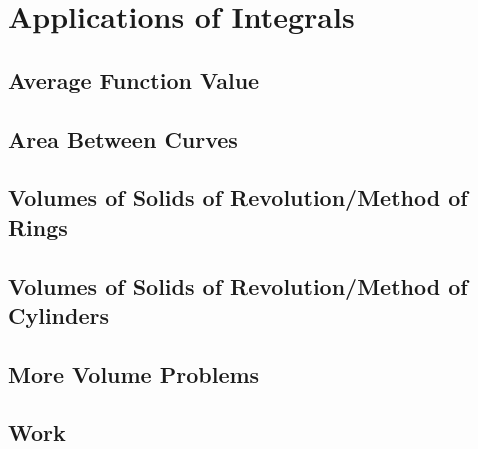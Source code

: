 \documentclass[../satmath.tex]{subfiles}
\begin{document}
\chapter{Applications of Integrals}
\section{Average Function Value}
\section{Area Between Curves}
\section{Volumes of Solids of Revolution/Method of Rings}
\section{Volumes of Solids of Revolution/Method of Cylinders}
\section{More Volume Problems}
\section{Work}
\end{document}
